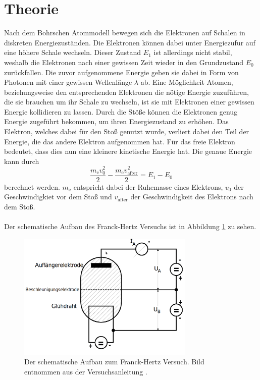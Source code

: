 \section{Theorie}
\label{sec:Theorie}
Nach dem Bohrschen Atommodell bewegen sich die Elektronen auf Schalen in diskreten Energiezuständen.
Die Elektronen können dabei unter Energiezufur auf eine höhere Schale wechseln.
Dieser Zustand $E_1$ ist allerdings nicht stabil, weshalb die Elektronen nach einer gewissen Zeit wieder in den Grundzustand $E_0$ zurückfallen.
Die zuvor aufgenommene Energie geben sie dabei in Form von Photonen mit einer gewissen Wellenlänge $\lambda$ ab.
Eine Möglichkeit Atomen, beziehungsweise den entsprechenden Elektronen die nötige Energie zuzuführen, die sie brauchen um ihr Schale zu wechseln, ist sie mit Elektronen einer gewissen Energie kollidieren zu lassen.
Durch die Stöße können die Elektronen genug Energie zugeführt bekommen, um ihren Energiezustand zu erhöhen.
Das Elektron, welches dabei für den Stoß genutzt wurde, verliert dabei den Teil der Energie, die das andere Elektron aufgenommen hat.
Für das freie Elektron bedeutet, dass dies nun eine kleinere kinetische Energie hat.
Die genaue Energie kann durch 
\begin{equation*}
    \frac{m_\text{e} v_0^2}{2} - \frac{m_\text{e}v_\text{after}^2}{2} = E_1 - E_0
\end{equation*} 
berechnet werden. $m_\text{e}$ entspricht dabei der Ruhemasse eines Elektrons, $v_0$ der Geschwindigkiet vor dem Stoß und $v_\text{after}$ der Geschwindigkeit des Elektrons nach dem Stoß.
\\\\
Der schematische Aufbau des Franck-Hertz Versuchs ist in Abbildung \ref{fig:schematischeraufbau} zu sehen.
\begin{figure}
    \centering
    \includegraphics[width=0.75\textwidth]{content/data/schematischeraufbau.png}
    \caption{Der schematische Aufbau zum Franck-Hertz Versuch. Bild entnommen aus der Versuchsanleitung \cite[2]{anleitung}.}
    \label{fig:schematischeraufbau}
\end{figure}
